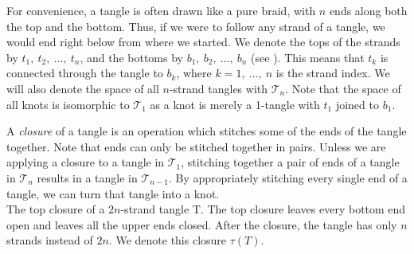 \documentclass{ws-jktr}
\begin{document}
For convenience, a tangle is often drawn like a pure braid, with $n$ ends along
both the top and the bottom.
Thus, if we were to follow any strand of a tangle, we would end right below
from where we started.
We denote the tops of the strands by $t_1,~t_2,~\dots,~t_n$, and the
bottoms by $b_1,~b_2,~\dots,~b_n$ (see \figTangle).
This means that $t_k$ is connected through the tangle to $b_k$, where
$k=1,~\dots,~n$ is the strand index.
We will also denote the space of all $n$-strand tangles with $\mathcal{T}_n$.
Note that the space of all knots is isomorphic to $\mathcal{T}_1$ as a knot is
merely a 1-tangle with $t_1$ joined to $b_1$.

A \textit{closure} of a tangle is an operation which stitches some of the ends
of the tangle together.
Note that ends can only be stitched together in pairs.
Unless we are applying a closure to a tangle in $\mathcal{T}_1$, stitching
together a pair of ends of a tangle in $\mathcal{T}_n$ results in a tangle in
$\mathcal{T}_{n-1}$.
By appropriately stitching every single end of a tangle, we can turn that tangle
into a knot.\\

{The top closure of a $2n$-strand tangle T.
The top closure leaves every bottom end open and leaves all the upper ends
closed.
After the closure, the tangle has only $n$ strands instead of $2n$.
We denote this closure $\tau(T)$.}\\
\end{document}
